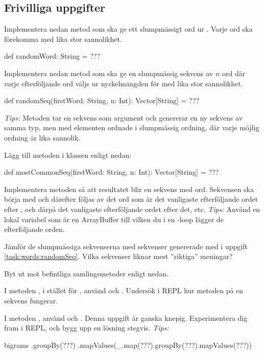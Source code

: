 \subsection{Frivilliga uppgifter} 

\Task Implementera nedan metod som ska ge ett slumpmässigt ord ur . Varje ord ska förekomma med lika stor sannolikhet.
\begin{Code}
def randomWord: String = ???
\end{Code}

\Task \label{task:words:randomSeq} Implementera nedan metod som ska ge en slumpmässig sekvens av $n$ ord där varje efterföljande ord väljs ur nyckelmängden för  med lika stor sannolikhet.
\begin{Code}
def randomSeq(firstWord: String, n: Int): Vector[String] = ???
\end{Code}
\emph{Tips:} Metoden  tar en sekvens som argument och genererar en ny sekvens av samma typ, men med elementen ordnade i slumpmässig ordning, där varje möjlig ordning är lika sannolik.

\Task \label{task:words:mostCommonSeq} Lägg till metoden  i klassen  enligt nedan: 
\begin{Code}
def mostCommonSeq(firstWord: String, n: Int): Vector[String] = ???
\end{Code}
\Subtask Implementera metoden så att resultatet blir en sekvens med  ord. Sekvensen ska börja med  och därefter följas av det ord som är det vanligaste efterföljande ordet efter , och därpå det vanligaste efterföljande ordet efter det, etc. \emph{Tips:} Använd en lokal variabel  som är en ArrayBuffer till vilken du i en -loop lägger de efterföljande orden. 

\Subtask Jämför de slumpmässiga sekvenserna med sekvenser genererade med  i uppgift \ref{task:words:randomSeq}. Vilka sekvenser liknar mest ''riktiga'' meningar?


\Task Byt ut  mot befintliga samlingsmetoder enligt nedan.

\Subtask I metoden , i stället för , använd  och . Undersök i REPL hur metoden  på en sekvens fungerar.

\Subtask I metoden , använd  och . Denna uppgift är ganska knepig. Experimentera dig fram i REPL, och bygg upp en lösning stegvis. \emph{Tips:}
\begin{Code}
bigrams
  .groupBy(???)
  .mapValues(_.map(???).groupBy(???).mapValues(???))
\end{Code}





